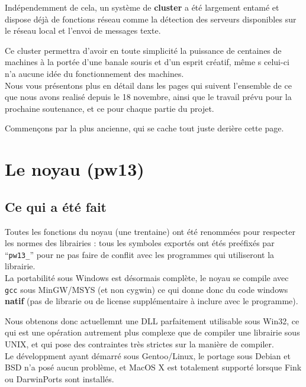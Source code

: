 \documentclass[14pt,a4paper]{report}
\begin{document}
Ind\'ependemment de cela, un syst\`eme de {\bf cluster} a \'et\'e
largement entam\'e et dispose d\'ej\`a de fonctions r\'eseau comme
la d\'etection des serveurs disponibles sur le r\'eseau local
et l'envoi de messages texte.

Ce cluster permettra d'avoir en toute simplicit\'e la puissance de
centaines de machines \`a la port\'ee d'une banale souris et d'un
esprit cr\'eatif, m\^eme s celui-ci n'a aucune id\'ee du fonctionnement
des machines.\\

Nous vous pr\'esentons plus en d\'etail dans les pages qui suivent
l'ensemble de ce que nous avons realis\'e depuis le 18 novembre,
ainsi que le travail pr\'evu pour la prochaine
soutenance, et ce pour chaque partie du projet.

Commen\c{c}ons par la plus ancienne, qui se cache tout juste
deri\`ere cette page.


\chapter{Le noyau ({\bf pw13})}

\section{Ce qui a \'et\'e fait}

Toutes les fonctions du noyau (une trentaine) ont \'et\'e
renomm\'ees pour respecter les normes
des librairies : tous les symboles export\'es ont \'et\'es pre\'efix\'es
par ``{\tt pw13\_}'' pour ne pas faire de conflit avec les programmes qui
utiliseront la librairie. \\

La portabilit\'e sous Windows est d\'esormais compl\`ete, le noyau se
compile avec {\tt gcc} sous MinGW/MSYS (et non cygwin) ce qui donne donc du
code windows {\bf natif} (pas de librarie ou de license suppl\'ementaire
\`a inclure avec le programme).

Nous obtenons donc actuellemnt une DLL parfaitement utilisable sous Win32,
ce qui est une op\'eration autrement plus complexe que de compiler
une librairie sous UNIX, et qui pose des
contraintes tr\`es strictes sur la mani\`ere de compiler. \\

Le d\'eveloppment ayant d\'emarr\'e sous Gentoo/Linux, le portage
sous Debian et BSD n'a pos\'e aucun probl\`eme, et
MacOS X est totalement support\'e lorsque Fink ou DarwinPorts sont
install\'es. \\
\end{document}
